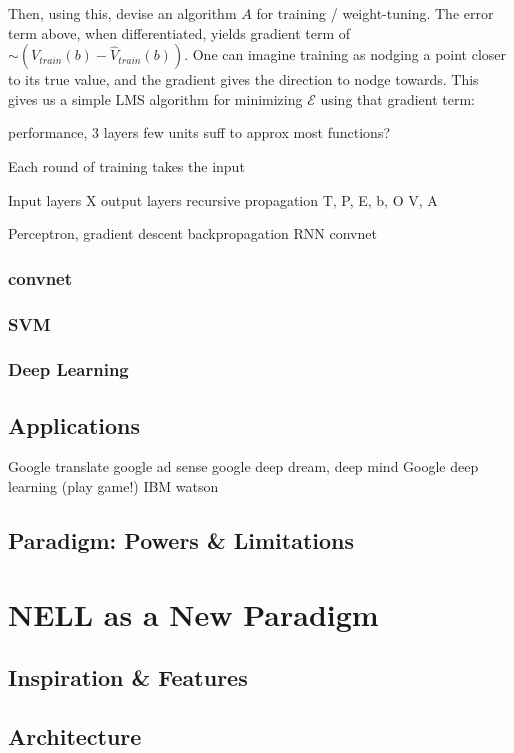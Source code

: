 \documentclass[12pt]{article}  %
\begin{document}
Then, using this, devise an algorithm $A$ for training / weight-tuning. The error term above, when differentiated, yields gradient term of $\sim(V_{train}(b) - \hat{V}_{train}(b))$. One can imagine training as nodging a point closer to its true value, and the gradient gives the direction to nodge towards. This gives us a simple LMS algorithm for minimizing $\mathcal{E}$ using that gradient term:




performance, 3 layers few units suff to approx most functions?

Each round of training takes the input 


Input layers X
output layers
recursive propagation
T, P, E, b, O
V, A

Perceptron,
gradient descent
backpropagation
RNN
convnet


\subsubsection{convnet}
\subsubsection{SVM}
\subsubsection{Deep Learning}

\subsection{Applications}
Google translate
google ad sense
google deep dream, deep mind
Google deep learning (play game!)
IBM watson


\subsection{Paradigm: Powers \& Limitations}



\section{NELL as a New Paradigm}

\subsection{Inspiration \& Features}
\subsection{Architecture}
\end{document}

